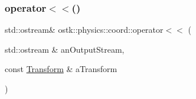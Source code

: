 \subsubsection{\texorpdfstring{operator$<$$<$()}{operator<<()}\hspace{0.1cm}{\footnotesize\ttfamily [5/5]}}
{\footnotesize\ttfamily std\+::ostream\& ostk\+::physics\+::coord\+::operator$<$$<$ (\begin{DoxyParamCaption}\item[{std\+::ostream \&}]{an\+Output\+Stream,  }\item[{const \hyperlink{classostk_1_1physics_1_1coord_1_1_transform}{Transform} \&}]{a\+Transform }\end{DoxyParamCaption})}

